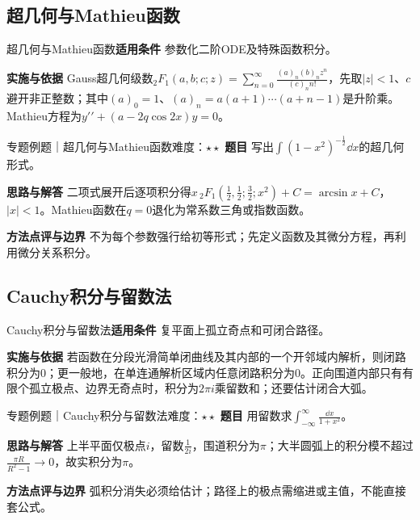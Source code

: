 \subsection{超几何与Mathieu函数}\label{mat:special_integrals:hypergeom}
\begin{method}{超几何与Mathieu函数}\textbf{适用条件} 参数化二阶ODE及特殊函数积分。\par\textbf{实施与依据} Gauss超几何级数${}_2F_1(a,b;c;z)=\sum_{n=0}^\infty\frac{(a)_n(b)_n z^n}{(c)_nn!}$，先取$|z|<1$、$c$避开非正整数；其中$(a)_0=1$、$(a)_n=a(a+1)\cdots(a+n-1)$是升阶乘。Mathieu方程为$y\prime\prime+(a-2q\cos2x)y=0$。\end{method}
\begin{example}{专题例题｜超几何与Mathieu函数}{难度：$\star\star$}
\textbf{题目} 写出$\int(1-x^2)^{-\frac{1}{2}}\dd x$的超几何形式。\par\textbf{思路与解答} 二项式展开后逐项积分得$x\,{}_2F_1(\frac{1}{2},\frac{1}{2};\frac{3}{2};x^2)+C=\arcsin x+C$，$|x|<1$。Mathieu函数在$q=0$退化为常系数三角或指数函数。\par\textbf{方法点评与边界} 不为每个参数强行给初等形式；先定义函数及其微分方程，再利用微分关系积分。
\end{example}
\subsection{Cauchy积分与留数法}\label{mat:special_integrals:residue}
\begin{method}{Cauchy积分与留数法}\textbf{适用条件} 复平面上孤立奇点和可闭合路径。\par\textbf{实施与依据} 若函数在分段光滑简单闭曲线及其内部的一个开邻域内解析，则闭路积分为0；更一般地，在单连通解析区域内任意闭路积分为0。正向围道内部只有有限个孤立极点、边界无奇点时，积分为$2\pi i$乘留数和；还要估计闭合大弧。\end{method}
\begin{example}{专题例题｜Cauchy积分与留数法}{难度：$\star\star$}
\textbf{题目} 用留数求$\int_{-\infty}^\infty\frac{\dd x}{1+x^2}$。\par\textbf{思路与解答} 上半平面仅极点$i$，留数$\frac{1}{2i}$，围道积分为$\pi$；大半圆弧上的积分模不超过$\frac{\pi R}{R^2-1}\to0$，故实积分为$\pi$。\par\textbf{方法点评与边界} 弧积分消失必须给估计；路径上的极点需缩进或主值，不能直接套公式。
\end{example}
